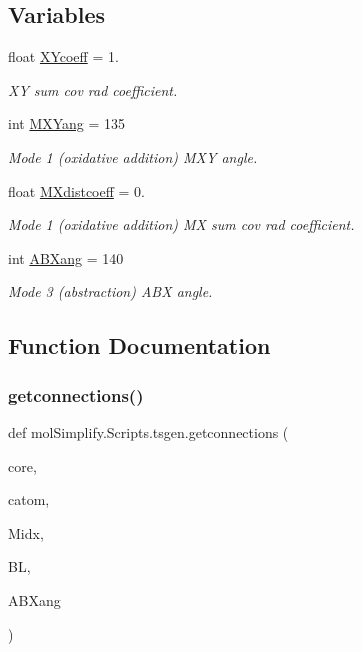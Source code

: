 \subsection*{Variables}
\begin{DoxyCompactItemize}
\item 
float \hyperlink{namespacemolSimplify_1_1Scripts_1_1tsgen_a0d48d88fd33cd358c1207a60f8db09fa}{X\+Ycoeff} = 1.
\begin{DoxyCompactList}\small\item\em XY sum cov rad coefficient. \end{DoxyCompactList}\item 
int \hyperlink{namespacemolSimplify_1_1Scripts_1_1tsgen_a27e6b63f27d41cb0442aa856b6743533}{M\+X\+Yang} = 135
\begin{DoxyCompactList}\small\item\em Mode 1 (oxidative addition) M\+XY angle. \end{DoxyCompactList}\item 
float \hyperlink{namespacemolSimplify_1_1Scripts_1_1tsgen_a15badf85c643c7785a7c5603154e2b67}{M\+Xdistcoeff} = 0.
\begin{DoxyCompactList}\small\item\em Mode 1 (oxidative addition) MX sum cov rad coefficient. \end{DoxyCompactList}\item 
int \hyperlink{namespacemolSimplify_1_1Scripts_1_1tsgen_a04e8e706dd6866bed934574a55c5960a}{A\+B\+Xang} = 140
\begin{DoxyCompactList}\small\item\em Mode 3 (abstraction) A\+BX angle. \end{DoxyCompactList}\end{DoxyCompactItemize}


\subsection{Function Documentation}
\mbox{\label{namespacemolSimplify_1_1Scripts_1_1tsgen_a87681ac0a98980187ecb8cd451419539}} 
\subsubsection{\texorpdfstring{getconnections()}{getconnections()}}
{\footnotesize\ttfamily def mol\+Simplify.\+Scripts.\+tsgen.\+getconnections (\begin{DoxyParamCaption}\item[{}]{core,  }\item[{}]{catom,  }\item[{}]{Midx,  }\item[{}]{BL,  }\item[{}]{A\+B\+Xang }\end{DoxyParamCaption})}



